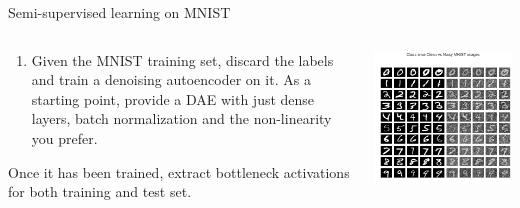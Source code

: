 \documentclass[aspectratio=169]{beamer}
\begin{document}
\begin{frame}{Semi-supervised learning on MNIST}
\begin{columns}
\begin{column}{0.5\textwidth}
\begin{enumerate}
    \item Given the MNIST training set, discard the labels and train a denoising autoencoder on it. As a starting point, provide a DAE with just dense layers, batch normalization and the non-linearity you prefer. 
\end{enumerate}
\vspace{0.4cm}
Once it has been trained, extract bottleneck activations for both training and test set.
\end{column}
\begin{column}{0.5\textwidth}  %
    \begin{center}
	\includegraphics[width=1.0\textwidth]{img/autoencoder/mnist_noisy.png}
     \end{center}
\end{column}
\end{columns}
\end{frame}
\end{document}
